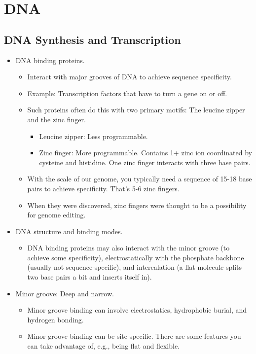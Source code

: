 \documentclass[../notes.tex]{subfiles}
\begin{document}
\chapter{DNA}
\section{DNA Synthesis and Transcription}
\begin{itemize}
    \item {}DNA binding proteins.
    \begin{itemize}
        \item Interact with major grooves of DNA to achieve sequence specificity.
        \item Example: Transcription factors that have to turn a gene on or off.
        \item Such proteins often do this with two primary motifs: The leucine zipper and the zinc finger.
        \begin{itemize}
            \item Leucine zipper: Less programmable.
            \item Zinc finger: More programmable. Contains 1+ zinc ion coordinated by cysteine and histidine. One zinc finger interacts with three base pairs.
        \end{itemize}
        \item With the scale of our genome, you typically need a sequence of 15-18 base pairs to achieve specificity. That's 5-6 zinc fingers.
        \item When they were discovered, zinc fingers were thought to be a possibility for genome editing.
    \end{itemize}
    \item DNA structure and binding modes.
    \begin{itemize}
        \item DNA binding proteins may also interact with the minor groove (to achieve some specificity), electrostatically with the phosphate backbone (usually not sequence-specific), and intercalation (a flat molecule splits two base pairs a bit and inserts itself in).
    \end{itemize}
    \item Minor groove: Deep and narrow.
    \begin{itemize}
        \item Minor groove binding can involve electrostatics, hydrophobic burial, and hydrogen bonding.
        \item Minor groove binding can be site specific. There are some features you can take advantage of, e.g., being flat and flexible.

\end{itemize}
\end{itemize}
\end{document}
